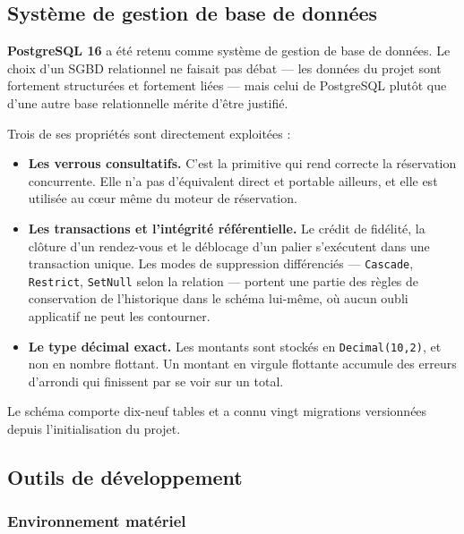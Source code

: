\subsection{Système de gestion de base de données}

\textbf{PostgreSQL 16} a été retenu comme système de gestion de base de
données. Le choix d'un SGBD relationnel ne faisait pas débat --- les données du
projet sont fortement structurées et fortement liées --- mais celui de
PostgreSQL plutôt que d'une autre base relationnelle mérite d'être justifié.

Trois de ses propriétés sont directement exploitées :

\begin{itemize}[leftmargin=1.2cm]
  \item \textbf{Les verrous consultatifs.} C'est la primitive qui rend correcte
  la réservation concurrente. Elle n'a pas d'équivalent direct et portable
  ailleurs, et elle est utilisée au c\oe ur même du moteur de réservation.

  \item \textbf{Les transactions et l'intégrité référentielle.} Le crédit de
  fidélité, la clôture d'un rendez-vous et le déblocage d'un palier
  s'exécutent dans une transaction unique. Les modes de suppression
  différenciés --- \texttt{Cascade}, \texttt{Restrict}, \texttt{SetNull} selon
  la relation --- portent une partie des règles de conservation de
  l'historique dans le schéma lui-même, où aucun oubli applicatif ne peut les
  contourner.

  \item \textbf{Le type décimal exact.} Les montants sont stockés en
  \texttt{Decimal(10,2)}, et non en nombre flottant. Un montant en virgule
  flottante accumule des erreurs d'arrondi qui finissent par se voir sur un
  total.
\end{itemize}

Le schéma comporte dix-neuf tables et a connu vingt migrations versionnées
depuis l'initialisation du projet.

\subsection{Outils de développement}

\subsubsection{Environnement matériel}

